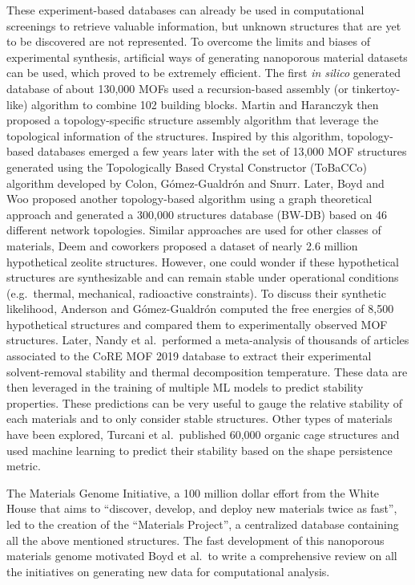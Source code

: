 \documentclass[main.tex]{subfiles}
\begin{document}
These experiment-based databases can already be used in computational screenings to retrieve valuable information, but unknown structures that are yet to be discovered are not represented. To overcome the limits and biases of experimental synthesis, artificial ways of generating nanoporous material datasets can be used, which proved to be extremely efficient. The first \emph{in silico} generated database of about 130,000 MOFs used a recursion-based assembly (or tinkertoy-like) algorithm to combine 102 building blocks.\cite{Wilmer_2012} Martin and Haranczyk then proposed a topology-specific structure assembly algorithm that leverage the topological information of the structures.\cite{Martin_2014} Inspired by this algorithm, topology-based databases emerged a few years later with the set of 13,000 MOF structures generated using the Topologically Based Crystal Constructor (ToBaCCo) algorithm developed by Colon, G{\'{o}}mez-Gualdr{\'{o}}n and Snurr.\cite{Colon_2017}
Later, Boyd and Woo proposed another topology-based algorithm using a graph theoretical approach and generated a 300,000 structures database (BW-DB) based on 46 different network topologies.\cite{Boyd_2016}
Similar approaches are used for other classes of materials, Deem and coworkers proposed a dataset of nearly 2.6 million hypothetical zeolite structures.\cite{Earl_2006,Deem_2009,Pophale_2011}
However, one could wonder if these hypothetical structures are synthesizable and can remain stable under operational conditions (e.g.\ thermal, mechanical, radioactive constraints). To discuss their synthetic likelihood, Anderson and G{\'{o}}mez-Gualdr{\'{o}}n computed the free energies of 8,500 hypothetical structures and compared them to experimentally observed MOF structures.\cite{Anderson_2020}
Later, Nandy et al.\ performed a meta-analysis of thousands of articles associated to the CoRE MOF 2019 database to extract their experimental solvent-removal stability and thermal decomposition temperature.\cite{Nandy_2021} These data are then leveraged in the training of multiple ML models to predict stability properties. These predictions can be very useful to gauge the relative stability of each materials and to only consider stable structures. Other types of materials have been explored, Turcani et al.\ published 60,000 organic cage structures and used machine learning to predict their stability based on the shape persistence metric.\cite{Turcani_2018}

The Materials Genome Initiative, a 100 million dollar effort from the White House that aims to ``discover, develop, and deploy new materials twice as fast'', led to the creation of the ``Materials Project'', a centralized database containing all the above mentioned structures.\cite{kalil2011national,Matgenome,Jain_2013}
The fast development of this nanoporous materials genome motivated Boyd et al.\ to write a comprehensive review on all the initiatives on generating new data for computational analysis.\cite{Boyd_2017}
\end{document}
